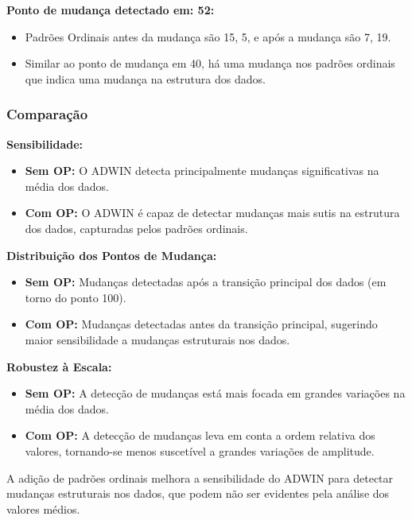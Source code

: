 \documentclass[
]{article}
\providecommand{\tightlist}{%
  \setlength{\itemsep}{0pt}\setlength{\parskip}{0pt}}
\begin{document}
\textbf{Ponto de mudança detectado em: 52:}

\begin{itemize}
\tightlist
\item
  Padrões Ordinais antes da mudança são 15, 5, e após a mudança são 7,
  19.
\item
  Similar ao ponto de mudança em 40, há uma mudança nos padrões ordinais
  que indica uma mudança na estrutura dos dados.
\end{itemize}

\hypertarget{comparauxe7uxe3o}{%
\subsubsection{Comparação}\label{comparauxe7uxe3o}}

\textbf{Sensibilidade:}

\begin{itemize}
\tightlist
\item
  \textbf{Sem OP:} O ADWIN detecta principalmente mudanças
  significativas na média dos dados.
\item
  \textbf{Com OP:} O ADWIN é capaz de detectar mudanças mais sutis na
  estrutura dos dados, capturadas pelos padrões ordinais.
\end{itemize}

\textbf{Distribuição dos Pontos de Mudança:}

\begin{itemize}
\tightlist
\item
  \textbf{Sem OP:} Mudanças detectadas após a transição principal dos
  dados (em torno do ponto 100).
\item
  \textbf{Com OP:} Mudanças detectadas antes da transição principal,
  sugerindo maior sensibilidade a mudanças estruturais nos dados.
\end{itemize}

\textbf{Robustez à Escala:}

\begin{itemize}
\tightlist
\item
  \textbf{Sem OP:} A detecção de mudanças está mais focada em grandes
  variações na média dos dados.
\item
  \textbf{Com OP:} A detecção de mudanças leva em conta a ordem relativa
  dos valores, tornando-se menos suscetível a grandes variações de
  amplitude.
\end{itemize}

A adição de padrões ordinais melhora a sensibilidade do ADWIN para
detectar mudanças estruturais nos dados, que podem não ser evidentes
pela análise dos valores médios.
\end{document}

